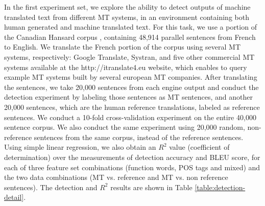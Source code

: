 \documentclass[11pt]{article}
\begin{document}
In the first experiment set, we explore the ability to detect outputs of machine translated text from different MT systems, in an environment containing both human generated and machine translated text. For this task, we use a portion of the Canadian Hansard corpus \cite{hansard2001}, containing 48,914 parallel sentences from French to English. We translate the French portion of the corpus using several MT systems, respectively: Google Translate, Systran, and five other commercial MT systems available at the http://itranslate4.eu website, which enables to query example MT systems built by several european MT companies. After translating the sentences, we take 20,000 sentences from each engine output and conduct the detection experiment by labeling those sentences as MT sentences, and another 20,000 sentences, which are the human reference translations, labeled as reference sentences. We conduct a 10-fold cross-validation experiment on the entire 40,000 sentence corpus. We also conduct the same experiment using 20,000 random, non-reference sentences from the same corpus, instead of the reference sentences. Using simple linear regression, we also obtain an $R^2$ value (coefficient of determination) over the measurements of detection accuracy and BLEU score, for each of three feature set combinations (function words, POS tags and mixed) and the two data combinations (MT vs. reference and MT vs. non reference sentences). The detection and $R^2$ results are shown in Table \ref{table:detection-detail}.
\end{document}
